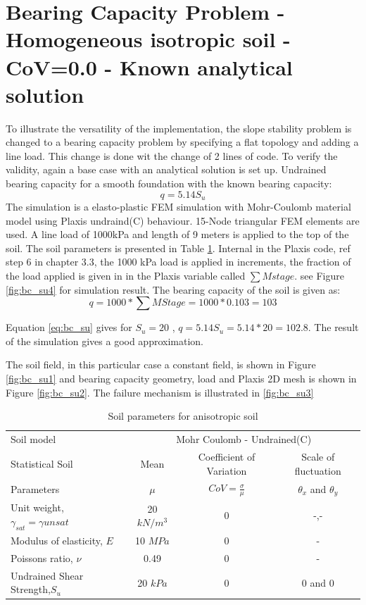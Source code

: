 \section{Bearing Capacity Problem - Homogeneous isotropic soil - CoV=0.0 - Known analytical solution}

To illustrate the versatility of the implementation, the slope stability problem is changed to a bearing capacity problem by specifying a flat topology and adding a line load.
This change is done wit the change of 2 lines of code.
To verify the validity, again a base case with an analytical solution is set up. Undrained bearing capacity for a smooth foundation with the known bearing capacity:
\begin{equation}
	\label{eq:bc_su}
	q = 5.14 S_u 
\end{equation}
The simulation is a elasto-plastic FEM simulation with Mohr-Coulomb material model using Plaxis undraind(C) behaviour. 15-Node triangular FEM elements are used. A line load of 1000kPa and length of 9 meters is applied to the top of the soil. 
The soil parameters is presented in Table \ref{tab:bc_su}. 
Internal in the Plaxis code, ref step 6 in chapter 3.3, the 1000 kPa load is applied in increments, the fraction of the load applied is given in in the Plaxis variable called $\sum M stage$. see Figure \ref{fig:bc_su4} for simulation result.
The bearing capacity of the soil is given as:
\begin{equation}
	\label{eq:bc_su2}
	q = 1000*\sum M Stage = 1000 * 0.103 = 103 
\end{equation}

Equation \ref{eq:bc_su} gives for $S_u = 20$ , $q=5.14 S_u = 5.14 * 20 = 102.8$. The result of the simulation gives a good approximation. 

The soil field, in this particular case a constant field, is shown in Figure \ref{fig:bc_su1} and bearing capacity geometry, load and Plaxis 2D mesh is shown in Figure \ref{fig:bc_su2}. The failure mechanism is illustrated in \ref{fig:bc_su3}


\begin{table}[h]
	\centering\small
	\caption{Soil parameters for anisotropic soil}
	\label{tab:bc_su}
		\begin{tabular*}{\textwidth}{@{\extracolsep{\fill}}lccc}
			\toprule
			 Soil model  &\multicolumn{3}{c}{Mohr Coulomb - Undrained(C)}\\
  \cmidrule{2-4}
			Statistical Soil	& Mean		 	& Coefficient of Variation 		& Scale of fluctuation \\
			Parameters	  	& $\mu$ 		&  $CoV = \frac{\sigma}{\mu}$ 		& $\theta_x$ and $\theta_y$ \\
        
			\midrule
			  Unit weight, $\gamma_{sat}=\gamma{unsat}$ & 20 $kN/m^3$ & 0 & -,- \\
		          Modulus of elasticity, $E$ & 10 $MPa$ & 0 & - \\
		          Poissons ratio, $\nu$ & 0.49 & 0 & - \\
		          Undrained Shear Strength,$S_u$ & 20 $kPa$ & 0 & 0 and 0 \\
			\bottomrule
		\end{tabular*}
\end{table}

